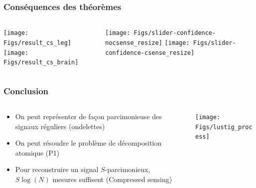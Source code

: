 \documentclass[french]{beamer}
\begin{document}
	\begin{frame}
		\frametitle{Conséquences des théorèmes}
		\begin{columns}[T]
			\begin{column}{.7\textwidth}
				\texttt{[image: Figs/result\_cs\_leg]} 
				\texttt{[image: Figs/result\_cs\_brain]} 
			\end{column}
			\begin{column}{.3\textwidth}
				\vspace*{-1.5cm}
				\texttt{[image: Figs/slider-confidence-nocsense\_resize]}
				\vspace*{-0.5cm}
				\texttt{[image: Figs/slider-confidence-csense\_resize]}
			\end{column}
		\end{columns}
	\end{frame}

	\begin{frame}
		\frametitle{Conclusion}
		\begin{columns}[T]
			\begin{column}{.7\textwidth}
				\begin{itemize}
					\item On peut représenter de façon parcimonieuse des signaux réguliers (ondelettes)
					\item On peut résoudre le problème de décomposition atomique (P1)	
					\item Pour reconstruire un signal $S$-parcimonieux, $S\log(N)$ mesures suffisent (Compressed sensing)
				\end{itemize}
			\end{column}
			\begin{column}{.3\textwidth}
				\vspace*{-2.0cm}\hspace*{-1.0cm}\texttt{[image: Figs/lustig\_process]}
			\end{column}
		\end{columns}
	\end{frame}
\end{document}
